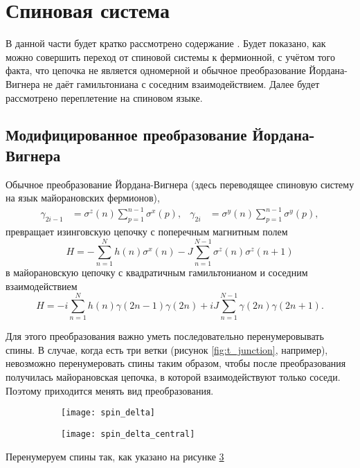 \documentclass[a4paper,12pt]{article}
\theoremstyle{plain} %
\theoremstyle{definition} %
\theoremstyle{remark} %
\begin{document}
\pagebreak

\section{Спиновая система}

В данной части будет кратко рассмотрено содержание \cite{main}. Будет показано, как можно совершить переход от спиновой системы к фермионной, с учётом того факта, что цепочка не является одномерной и обычное преобразование Йордана-Вигнера не даёт гамильтониана с соседним взаимодействием. Далее будет рассмотрено переплетение на спиновом языке.

\subsection{Модифицированное преобразование Йордана-Вигнера}

Обычное преобразование Йордана-Вигнера (здесь переводящее спиновую систему на язык майорановских фермионов),
\begin{align}
\gamma_{2i-1} &= \sigma^z (n) \sum\limits_{p=1}^{n-1} \sigma^x (p), & 
\gamma_{2i} &= \sigma^y (n) \sum\limits_{p=1}^{n-1} \sigma^y (p),
\end{align}
превращает изинговскую цепочку с поперечным магнитным полем
\begin{equation}
H = - \sum\limits_{n=1}^N h(n) \sigma^x(n) - J \sum\limits_{n=1}^{N-1} \sigma^z(n) \sigma^z(n+1)
\end{equation}
в майорановскую цепочку с квадратичным гамильтонианом и соседним взаимодействием
\begin{equation}
H = -i \sum\limits_{n=1}^N h(n) \gamma(2n-1) \gamma(2n) + i J \sum\limits_{n=1}^{N-1} \gamma(2n) \gamma(2n+1).
\end{equation}

Для этого преобразования важно уметь последовательно перенумеровывать спины. В случае, когда есть три ветки (рисунок \ref{fig:t_junction}, например), невозможно перенумеровать спины таким образом, чтобы после преобразования получилась майорановская цепочка, в которой взаимодействуют только соседи. Поэтому приходится менять вид преобразования.

\begin{figure}
    \centering
    \begin{subfigure}{0.5\textwidth}
        \centering
        \texttt{[image: spin\_delta]}
        \captionsetup{width=0.9\textwidth}
        \label{fig:spin_delta}
    \end{subfigure}%
    \begin{subfigure}{0.5\textwidth}
        \centering
        \texttt{[image: spin\_delta\_central]}
        \captionsetup{width=0.9\textwidth}
        \label{fig:spin_delta_central}
    \end{subfigure}
\end{figure}

Перенумеруем спины так, как указано на рисунке \ref{fig:spin_delta_central}
\pagebreak



\end{document}
